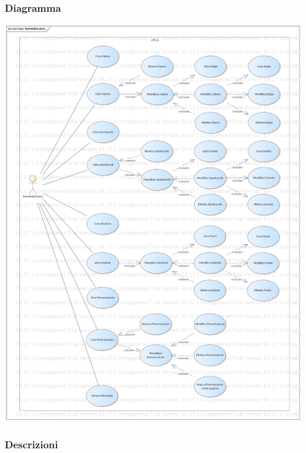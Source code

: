 \documentclass{article}
\begin{document}
            \subsubsection{Diagramma}
                \includegraphics[width=\textwidth]{imgs/use_case/amministratore}

            \subsubsection{Descrizioni}
\end{document}
